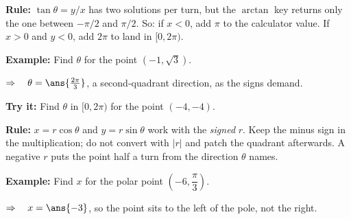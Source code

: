 \documentclass[12pt]{article}
\begin{document}


\begin{formulabox}
\textbf{Rule:} $\tan\theta = y/x$ has two solutions per turn, but the $\arctan$ key returns
only the one between $-\pi/2$ and $\pi/2$. So: if $x < 0$, add $\pi$ to the calculator
value. If $x > 0$ and $y < 0$, add $2\pi$ to land in $[0, 2\pi)$.
\end{formulabox}

\begin{examplebox}
\textbf{Example:} \quad Find $\theta$ for the point $(-1, \sqrt{3})$.

$\Rightarrow\quad \theta = \ans{\tfrac{2\pi}{3}}$, a second-quadrant direction, as the signs demand.
\end{examplebox}

\begin{tryitbox}
\textbf{Try it:} \quad Find $\theta$ in $[0, 2\pi)$ for the point $(-4, -4)$.\\[2pt]
\end{tryitbox}


\begin{formulabox}
\textbf{Rule:} $x = r\cos\theta$ and $y = r\sin\theta$ work with the \emph{signed} $r$.
Keep the minus sign in the multiplication; do not convert with $|r|$ and patch the quadrant
afterwards. A negative $r$ puts the point half a turn from the direction $\theta$ names.
\end{formulabox}

\begin{examplebox}
\textbf{Example:} \quad Find $x$ for the polar point $\left(-6, \dfrac{\pi}{3}\right)$.

$\Rightarrow\quad x = \ans{-3}$, so the point sits to the left of the pole, not the right.
\end{examplebox}
\end{document}
